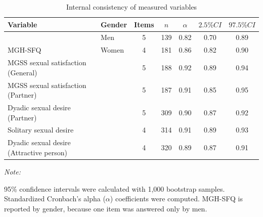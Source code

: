 \documentclass[
  bookmarksnumbered]{article}
\newenvironment{Shaded}{\begin{snugshade}}{\end{snugshade}}
\newcommand{\AttributeTok}[1]{\textcolor[rgb]{0.80,0.80,0.80}{#1}}
\newcommand{\ConstantTok}[1]{\textcolor[rgb]{0.86,0.64,0.64}{\textbf{#1}}}
\newcommand{\FunctionTok}[1]{\textcolor[rgb]{0.94,0.94,0.56}{#1}}
\newcommand{\NormalTok}[1]{\textcolor[rgb]{0.80,0.80,0.80}{#1}}
\newcommand{\SpecialCharTok}[1]{\textcolor[rgb]{0.86,0.64,0.64}{#1}}
\newcommand{\StringTok}[1]{\textcolor[rgb]{0.80,0.58,0.58}{#1}}
\begin{document}
\begin{Shaded}
\end{Shaded}

\begin{table}[H]
\centering
\caption{\label{tab:Cronbach-tab}Internal consistency of measured variables}
\centering
\begin{threeparttable}
\begin{tabular}[t]{llccccc}
\toprule
Variable & Gender & Items & $n$ & $\alpha$ & $2.5\% CI$ & $97.5\% CI$\\
\midrule
 & Men & 5 & 139 & 0.82 & 0.70 & 0.89\\
\cmidrule{2-7}
\multirow{-2}{*}{\raggedright\arraybackslash MGH-SFQ} & Women & 4 & 181 & 0.86 & 0.82 & 0.90\\
\cmidrule{1-7}
MGSS sexual satisfaction (General) &  & 5 & 188 & 0.92 & 0.89 & 0.94\\
\cmidrule{1-7}
MGSS sexual satisfaction (Partner) &  & 5 & 187 & 0.91 & 0.85 & 0.95\\
\cmidrule{1-7}
Dyadic sexual desire (Partner) &  & 5 & 309 & 0.90 & 0.87 & 0.92\\
\cmidrule{1-7}
Solitary sexual desire &  & 4 & 314 & 0.91 & 0.89 & 0.93\\
\cmidrule{1-7}
Dyadic sexual desire (Attractive person) &  & 4 & 320 & 0.89 & 0.87 & 0.91\\
\bottomrule
\end{tabular}
\begin{tablenotes}[para]
\item \textit{Note: } 
\item 95\% confidence intervals were calculated with 1,000 bootstrap samples.
           Standardized Cronbach's alpha ($\alpha$) coefficients were computed. 
           MGH-SFQ is reported by gender, because one item was answered only by men.
\end{tablenotes}
\end{threeparttable}
\end{table}
\end{document}

